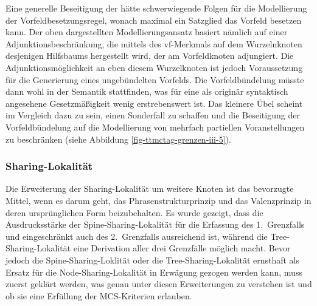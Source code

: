 Eine generelle Beseitigung der  hätte schwerwiegende Folgen für die Modellierung der Vorfeldbesetzungsregel, wonach maximal ein Satzglied das Vorfeld besetzen kann. Der oben dargestellten Modellierungsansatz basiert nämlich auf einer Adjunktionsbeschränkung, die mittels des {\sc vf}-Merkmals auf dem Wurzelnknoten desjenigen Hilfsbaums hergestellt wird, der am Vorfeldknoten adjungiert. Die Adjunktionsmöglichkeit an eben diesem Wurzelknoten ist jedoch Voraussetzung für die Generierung eines ungebündelten Vorfelds. Die Vorfeldbündelung müsste dann wohl in der Semantik stattfinden, was für eine als originär syntaktisch angesehene Gesetzmä\ss igkeit wenig erstrebenswert ist. Das kleinere Übel scheint im Vergleich dazu zu sein, einen Sonderfall zu schaffen und die Beseitigung der Vorfeldbündelung auf die Modellierung von mehrfach partiellen Voranstellungen zu beschränken (siehe Abbildung \ref{fig-ttmctag-grenzen-iii-5}). 


\subsubsection*{Sharing-Lokalität}

Die Erweiterung der Sharing-Lokalität um weitere Knoten ist das bevorzugte Mittel, wenn es darum geht, das Phrasenstrukturprinzip und das Valenzprinzip in deren ursprünglichen Form beizubehalten. Es wurde gezeigt, dass die Ausdrucksstärke der Spine-Sharing-Lokalität für die Erfassung des 1.~Grenzfalls und eingeschränkt auch des 2.~Grenzfalls ausreichend ist, während die Tree-Sharing-Lokalität eine Derivation aller drei Grenzfälle möglich macht. Bevor jedoch die Spine-Sharing-Loklität oder die Tree-Sharing-Lokalität ernsthaft als Ersatz für die Node-Sharing-Lokalität in Erwägung gezogen werden kann, muss zuerst geklärt werden, was genau unter diesen Erweiterungen zu verstehen ist und ob sie eine Erfüllung der MCS-Kriterien erlauben.  

